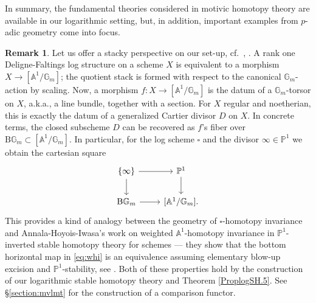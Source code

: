 \documentclass[11pt, a4paper]{amsart}
\theoremstyle{definition}
\newtheorem{rmk}[thm]{Remark}
\numberwithin{equation}{subsection}
\renewcommand{\P}{\mathbb{P}}
\newcommand{\boxx}{\square}
\begin{document}
In summary, 
the fundamental theories considered in motivic homotopy theory are available in our logarithmic setting, but, in addition, important examples from $p$-adic geometry come into focus.


\begin{rmk}Let us offer a stacky perspective on our set-up, 
cf.\ \cite{zbMATH06552967}, \cite{zbMATH02128586}.
A rank one Deligne-Faltings log structure on a scheme $X$ is equivalent to a morphism 
$X\to [\mathbb{A}^{1}/\mathbb{G}_{m}]$; 
the quotient stack is formed with respect to the canonical $\mathbb{G}_{m}$-action by scaling.
Now, a morphism $f\colon X\to [\mathbb{A}^{1}/\mathbb{G}_{m}]$ is the datum of a 
$\mathbb{G}_m$-torsor on $X$, a.k.a., a line bundle, together with a section.  
For $X$ regular and noetherian, 
this is exactly the datum of a generalized Cartier divisor $D$ on $X$. 
In concrete terms, 
the closed subscheme $D$ can be recovered as $f$'s fiber over 
$\mathrm{B}\mathbb{G}_m \subset [\mathbb{A}^{1}/\mathbb{G}_{m}]$.
In particular, 
for the log scheme $\boxx$ and the divisor $\infty\in \mathbb{P}^{1}$ 
we obtain the cartesian square 
\begin{equation}\label{eq:whi}
\begin{tikzcd}
\{\infty\} \ar[d] \ar[r] & \mathbb{P}^1 \arrow[d] \\
\mathrm{B}\mathbb{G}_m \ar[r] & {[\mathbb{A}^{1}/\mathbb{G}_{m}].}
\end{tikzcd}    
\end{equation}
This provides a kind of analogy between the geometry of $\boxx$-homotopy invariance and 
Annala-Hoyois-Iwasa's work on weighted $\mathbb{A}^{1}$-homotopy invariance in 
$\mathbb{P}^{1}$-inverted stable homotopy theory for schemes ---
they show that the bottom horizontal map in \eqref{eq:whi} is an equivalence assuming 
elementary blow-up excision and $\P^1$-stability, see \cite{AHI}. 
Both of these properties hold by the construction of our logarithmic stable homotopy theory
and Theorem \ref{ProplogSH.5}. See \S \ref{section:mvlmt} for the construction of a comparison functor. 
\end{rmk}
\end{document}
